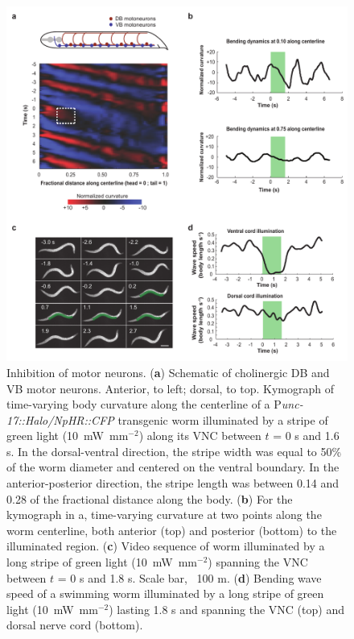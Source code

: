 \begin{figure} 
\includegraphics[width=\textwidth]{figures/colbert3}
\caption[Inhibition of motor neurons. ]{ Inhibition of motor neurons.  (\textbf{a}) Schematic of cholinergic DB and VB motor neurons. Anterior, to left; dorsal, to top. Kymograph of time-varying body curvature along the centerline of a P\textit{unc-17::Halo/NpHR::CFP} transgenic worm illuminated by a stripe of green light (10~mW~mm$^{-2}$) along its VNC between $t$ = 0 s and 1.6 s. In the dorsal-ventral direction, the stripe width was equal to 50\% of the worm diameter and centered on the ventral boundary. In the anterior-posterior direction, the stripe length was between 0.14 and 0.28 of the fractional distance along the body. (\textbf{b}) For the kymograph in a, time-varying curvature at two points along the worm centerline, both anterior (top) and posterior (bottom) to the illuminated region. (\textbf{c}) Video sequence of worm illuminated by a long stripe of green light (10~mW~mm$^{-2}$) spanning the VNC between $t$ = 0 s and 1.8 s. Scale bar, ~100 \textmu m. (\textbf{d}) Bending wave speed of a swimming worm illuminated by a long stripe of green light (10~mW~mm$^{-2}$) lasting 1.8 s and spanning the VNC (top) and dorsal nerve cord (bottom).\label{fig:colbert3}}
\end{figure}
\afterpage{\clearpage}


